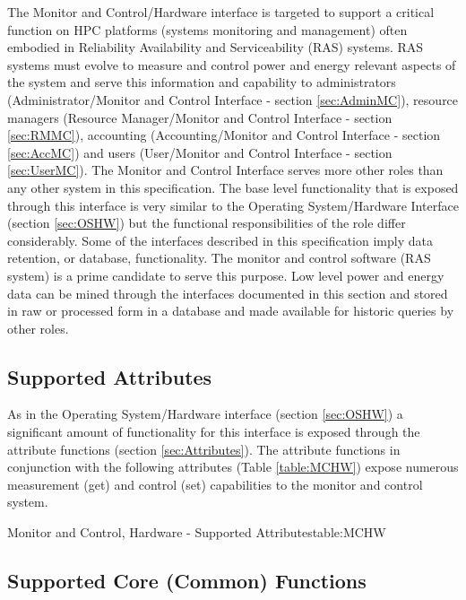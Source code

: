 The Monitor and Control/Hardware interface is targeted to support a critical function on HPC platforms (systems monitoring and management) often embodied in Reliability Availability and Serviceability (RAS) systems.
RAS systems must evolve to measure and control power and energy relevant aspects of the system and serve this information and capability to administrators (Administrator/Monitor and Control Interface - section \ref{sec:AdminMC}), resource managers (Resource Manager/Monitor and Control Interface - section \ref{sec:RMMC}), accounting (Accounting/Monitor and Control Interface - section \ref{sec:AccMC}) and users (User/Monitor and Control Interface - section \ref{sec:UserMC}).
The Monitor and Control Interface serves more other roles than any other system in this specification. 
The base level functionality that is exposed through this interface is very similar to the Operating System/Hardware Interface (section \ref{sec:OSHW}) but the functional responsibilities of the role differ considerably.
Some of the interfaces described in this specification imply data retention, or database, functionality. 
The monitor and control software (RAS system) is a prime candidate to serve this purpose. 
Low level power and energy data can be mined through the interfaces documented in this section and stored in raw or processed form in a database and made available for historic queries by other roles.

\subsection{Supported Attributes}\label{sec:MCHWAttributes}

As in the Operating System/Hardware interface (section \ref{sec:OSHW}) a significant amount of functionality for this interface is exposed through the attribute functions (section \ref{sec:Attributes}).
The attribute functions in conjunction with the following attributes (Table \ref{table:MCHW}) expose numerous measurement  (get) and control (set) capabilities to the monitor and control system.

\begin{attributetable}{Monitor and Control, Hardware - Supported Attributes}{table:MCHW}
\aPstateDesc
\aCstateDesc
\aCstateLimitDesc
\aSstateDesc
\aCurrentDesc
\aVoltageDesc
\aPowerDesc
\aMinPowerDesc
\aMaxPowerDesc
\aFreqDesc
\aFreqLimitMinDesc
\aFreqLimitMaxDesc
\aEnergyDesc
\aTempDesc
\end{attributetable}

\subsection{Supported Core (Common) Functions}\label{sec:MCHWSupportedCommon}

